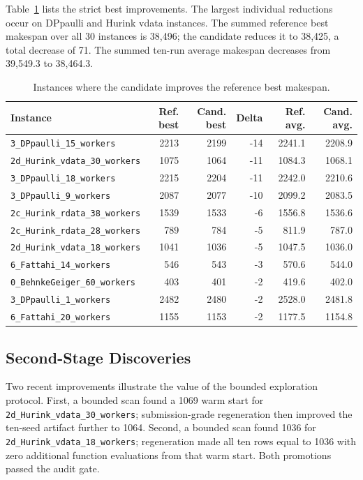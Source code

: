 \documentclass[sigconf,anonymous,review,dvipsnames]{acmart}
\begin{document}
Table~\ref{tab:strict} lists the strict best improvements.
The largest individual reductions occur on DPpaulli and Hurink vdata instances.
The summed reference best makespan over all 30 instances is 38,496; the candidate reduces it to 38,425, a total decrease of 71.
The summed ten-run average makespan decreases from 39,549.3 to 38,464.3.

\begin{table}[t]
  \centering
  \caption{Instances where the candidate improves the reference best makespan.}
  \label{tab:strict}
  \begin{tabular}{lrrrrr}
    \toprule
    Instance & Ref. best & Cand. best & Delta & Ref. avg. & Cand. avg. \\
    \midrule
    \texttt{3\_DPpaulli\_15\_workers} & 2213 & 2199 & -14 & 2241.1 & 2208.9 \\
    \texttt{2d\_Hurink\_vdata\_30\_workers} & 1075 & 1064 & -11 & 1084.3 & 1068.1 \\
    \texttt{3\_DPpaulli\_18\_workers} & 2215 & 2204 & -11 & 2242.0 & 2210.6 \\
    \texttt{3\_DPpaulli\_9\_workers} & 2087 & 2077 & -10 & 2099.2 & 2083.5 \\
    \texttt{2c\_Hurink\_rdata\_38\_workers} & 1539 & 1533 & -6 & 1556.8 & 1536.6 \\
    \texttt{2c\_Hurink\_rdata\_28\_workers} & 789 & 784 & -5 & 811.9 & 787.0 \\
    \texttt{2d\_Hurink\_vdata\_18\_workers} & 1041 & 1036 & -5 & 1047.5 & 1036.0 \\
    \texttt{6\_Fattahi\_14\_workers} & 546 & 543 & -3 & 570.6 & 544.0 \\
    \texttt{0\_BehnkeGeiger\_60\_workers} & 403 & 401 & -2 & 419.6 & 402.0 \\
    \texttt{3\_DPpaulli\_1\_workers} & 2482 & 2480 & -2 & 2528.0 & 2481.8 \\
    \texttt{6\_Fattahi\_20\_workers} & 1155 & 1153 & -2 & 1177.5 & 1154.8 \\
    \bottomrule
  \end{tabular}
\end{table}

\subsection{Second-Stage Discoveries}
Two recent improvements illustrate the value of the bounded exploration protocol.
First, a bounded scan found a 1069 warm start for \texttt{2d\_Hurink\_vdata\_30\_workers}; submission-grade regeneration then improved the ten-seed artifact further to 1064.
Second, a bounded scan found 1036 for \texttt{2d\_Hurink\_vdata\_18\_workers}; regeneration made all ten rows equal to 1036 with zero additional function evaluations from that warm start.
Both promotions passed the audit gate.
\end{document}
